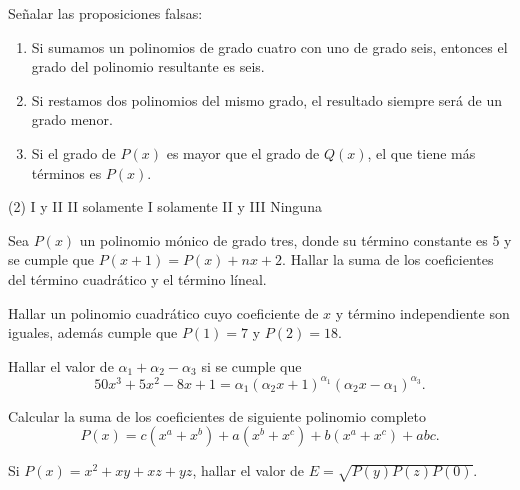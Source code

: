 \begin{multicols}{2}
    \begin{exercise}
        Señalar las proposiciones falsas:
        \begin{enumerate}[label=\Roman*.]
            \item Si sumamos un polinomios de grado cuatro con uno de grado seis, entonces el grado del polinomio resultante es seis.
            \item Si restamos dos polinomios del mismo grado, el resultado siempre será de un grado menor.
            \item Si el grado de $P(x)$ es mayor que el grado de $Q(x)$, el que tiene más términos es $P(x)$.
        \end{enumerate}
        \begin{tasks}(2)
            \task I y II
            \task II solamente
            \task I solamente
            \task II y III
            \task Ninguna
        \end{tasks}
    \end{exercise}

    \begin{problem}
        Sea $P(x)$ un polinomio mónico de grado tres, donde su término constante es 5 y se cumple que $P(x + 1) = P(x) + nx + 2$.
        Hallar la suma de los coeficientes del término cuadrático y el término líneal.
    \end{problem}

    \begin{problem}
        Hallar un polinomio cuadrático cuyo coeficiente de $x$ y término independiente son iguales, además cumple que $P(1) = 7$ y $P(2) = 18$.
    \end{problem}

    \begin{problem}
        Hallar el valor de $\alpha_1 + \alpha_2 - \alpha_3$ si se cumple que
        \[
            50x^3 + 5x^2 - 8x + 1 = \alpha_1 (\alpha_2 x + 1)^{\alpha_1} (\alpha_2 x - \alpha_1)^{\alpha_3}.
        \]
    \end{problem}

    \begin{problem}
        Calcular la suma de los coeficientes de siguiente polinomio completo
        \[
            P(x) = c(x^a + x^b) + a(x^b + x^c) + b(x^a + x^c) + abc.
        \]
    \end{problem}

    \begin{problem}
        Si $P(x) = x^2 + xy + xz + yz$, hallar el valor de $E = \sqrt {P(y)P(z)P(0)}$.
    \end{problem}


\end{multicols}
